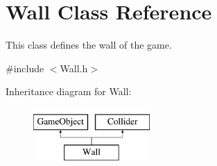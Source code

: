 \hypertarget{class_wall}{}\section{Wall Class Reference}
\label{class_wall}


This class defines the wall of the game.  




{\ttfamily \#include $<$Wall.\+h$>$}

Inheritance diagram for Wall\+:\begin{figure}[H]
\begin{center}
\leavevmode
\includegraphics[height=2.000000cm]{class_wall}
\end{center}
\end{figure}

